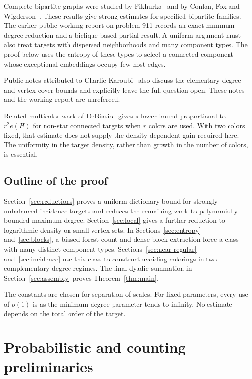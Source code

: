 \documentclass[11pt]{amsart}
\theoremstyle{definition}
\theoremstyle{remark}
\numberwithin{equation}{section}
\begin{document}
Complete bipartite graphs were studied by Pikhurko~\cite{Pikhurko} and by
Conlon, Fox and Wigderson~\cite{CFW}. These results give strong estimates for
specified bipartite families. The earlier public working report on problem 911
\cite{WorkingReport} records an exact minimum-degree reduction and a
biclique-based partial result. A uniform argument must also treat targets
with dispersed neighborhoods and many component types. The proof below uses
the entropy of these types to select a connected component whose exceptional
embeddings occupy few host edges.

Public notes attributed to Charlie Karoubi~\cite{Karoubi} also discuss
the elementary degree and vertex-cover bounds and explicitly leave the
full question open. These notes and the working report are unrefereed.

Related multicolor work of DeBiasio~\cite{DeBiasio} gives a lower bound
proportional to $r^2e(H)$ for non-star connected targets when $ r$ colors
are used. With two colors fixed, that estimate does not supply the
density-dependent gain required here. The uniformity in the target
density, rather than growth in the number of colors, is essential.

\subsection{Outline of the proof}
Section~\ref{sec:reductions} proves a uniform dictionary bound for
strongly unbalanced incidence targets and reduces the remaining work
to polynomially bounded maximum degree. Section~\ref{sec:local} gives a further reduction to
logarithmic density on small vertex sets. In
Sections~\ref{sec:entropy} and~\ref{sec:blocks}, a biased forest count and
dense-block extraction force a class with many distinct component types.
Sections~\ref{sec:near-regular} and~\ref{sec:incidence} use this class to
construct avoiding colorings in two complementary degree regimes. The
final dyadic summation in Section~\ref{sec:assembly} proves
Theorem~\ref{thm:main}.

The constants are chosen for separation of scales. For fixed parameters,
every use of $o(1)$ is as the minimum-degree parameter tends to infinity.
No estimate depends on the total order of the target.

\section{Probabilistic and counting preliminaries}\label{sec:preliminaries}
\end{document}
